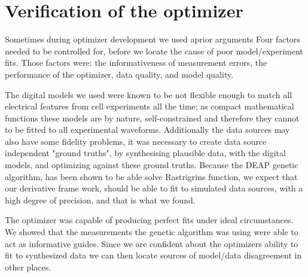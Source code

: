 \section{Verification of the optimizer}
Sometimes during optimizer development we used aprior arguments
Four factors needed to be controlled for, before we locate the cause of poor model/experiment fits. Those factors were: the informativeness of measurement errors, the performance of the optimizer, data quality, and model quality.

The digital models we used were known to be not flexible enough to match all electrical features from cell experiments all the time; as compact mathematical functions these models are by nature, self-constrained and therefore they cannot to be fitted to all experimental waveforms. Additionally the data sources may also have some fidelity problems, it was necessary to create data source independent "ground truths", by synthesising plausible data, with the digital models, and optimizing against these ground truths. Because the DEAP genetic algorithm, has been shown to be able solve Rastrigrins function, we expect that our derivative frame work, should be able to fit to simulated data sources, with a high degree of precision, and that is what we found.

The optimizer was capable of producing perfect fits under ideal circumstances. We showed that the measurements the genetic algorithm was using were able to act as informative guides. Since we are confident about the optimizers ability to fit to synthesized data we can then locate sources of model/data disagreement in other places. 

